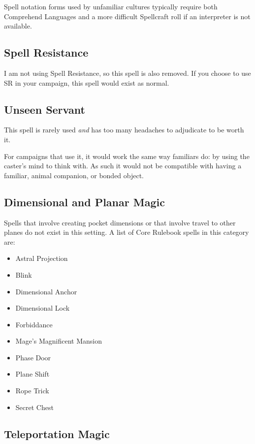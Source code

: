 Spell notation forms used by unfamiliar cultures typically require both
Comprehend Languages and a more difficult Spellcraft roll if an interpreter
is not available.
%

%
\subsection{Spell Resistance}

I am not using Spell Resistance, so this spell is also removed. If you
choose to use SR in your campaign, this spell would exist as normal.
%

%
\subsection{Unseen Servant}

This spell is rarely used \textit{and} has too many headaches to adjudicate
to be worth it.

For campaigns that use it, it would work the same way familiars do: by using
the caster's mind to think with. As such it would not be compatible with
having a familiar, animal companion, or bonded object.
%

%
\subsection{Dimensional and Planar Magic}

Spells that involve creating pocket dimensions or that involve travel to
other planes do not exist in this setting. A list of Core Rulebook spells
in this category are:

\begin{itemize}
\item Astral Projection
\item Blink
\item Dimensional Anchor
\item Dimensional Lock
\item Forbiddance
\item Mage's Magnificent Mansion
\item Phase Door
\item Plane Shift
\item Rope Trick
\item Secret Chest
\end{itemize}
%

%
\subsection{Teleportation Magic}

